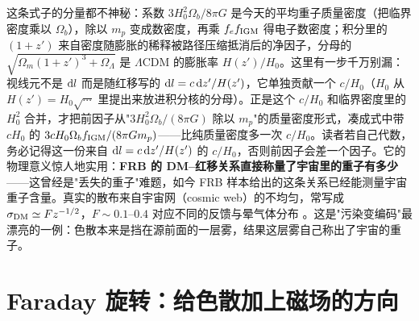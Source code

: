 这条式子的分量都不神秘：系数 \(3H_0^2\Omega_b/8\pi G\) 是今天的平均重子质量密度（把临界密度乘以 \(\Omega_b\)），除以 \(m_p\) 变成数密度，再乘 \(f_e f_{\rm IGM}\) 得电子数密度；积分里的 \((1+z')\) 来自密度随膨胀的稀释被路径压缩抵消后的净因子，分母的 \(\sqrt{\Omega_m(1+z')^3+\Omega_\Lambda}\) 是 \(\Lambda\)CDM 的膨胀率 \(H(z')/H_0\)。这里有一步千万别漏：视线元不是 \({\rm d}l\) 而是随红移写的 \({\rm d}l=c\,{\rm d}z'/H(z')\)，它单独贡献一个 \(c/H_0\)（\(H_0\) 从 \(H(z')=H_0\sqrt{\cdots}\) 里提出来放进积分核的分母）。正是这个 \(c/H_0\) 和临界密度里的 \(H_0^2\) 合并，才把前因子从"\(3H_0^2\Omega_b/(8\pi G)\) 除以 \(m_p\)"的质量密度形式，凑成式中带 \(cH_0\) 的 \(3cH_0\Omega_b f_{\rm IGM}/(8\pi Gm_p)\)——比纯质量密度多一次 \(c/H_0\)。读者若自己代数，务必记得这一份来自 \({\rm d}l=c\,{\rm d}z'/H(z')\) 的 \(c/H_0\)，否则前因子会差一个因子。它的物理意义惊人地实用：\textbf{FRB 的 DM–红移关系直接称量了宇宙里的重子有多少}——这曾经是"丢失的重子"难题，如今 FRB 样本给出的这条关系已经能测量宇宙重子含量。真实的散布来自宇宙网（cosmic web）的不均匀，常写成 \(\sigma_{\rm DM}\simeq F z^{-1/2}\)，\(F\sim0.1\text{--}0.4\) 对应不同的反馈与晕气体分布 \citep{2020Natur.581..391M,2014ApJ...790..101S}。这是"污染变编码"最漂亮的一例：色散本来是挡在源前面的一层雾，结果这层雾自己称出了宇宙的重子。

\section{Faraday 旋转：给色散加上磁场的方向}
\label{sec:e21-faraday}

